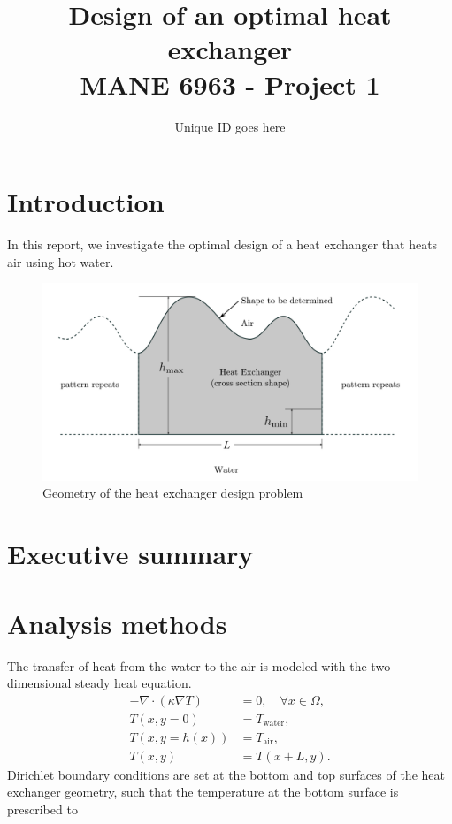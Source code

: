 \documentclass[11pt]{article}
\title{Design of an optimal heat exchanger\\MANE 6963 - Project 1}
\author{Unique ID goes here}
\date{}
\begin{document}
\maketitle

\section{Introduction}

In this report, we investigate the optimal design of a heat exchanger that
heats air using hot water.

\begin{figure}[htb]
\centering
\includegraphics[scale=0.5]{exchanger}
\caption{Geometry of the heat exchanger design problem}
\end{figure}

\section{Executive summary}

\section{Analysis methods}

The transfer of heat from the water to the air is modeled with the
two-dimensional steady heat equation.
\begin{align*}
- \nabla \cdot (\kappa \nabla T) &= 0, \quad \forall x \in \Omega, \\
T(x,y=0) &= T_{\text{water}}, \\
T(x,y=h(x)) &= T_{\text{air}}, \\
T(x,y) &= T(x+L,y).
\end{align*}
Dirichlet boundary conditions are set at the bottom and top
surfaces of the heat exchanger geometry, such that the temperature
at the bottom surface is prescribed to  
\end{document}
